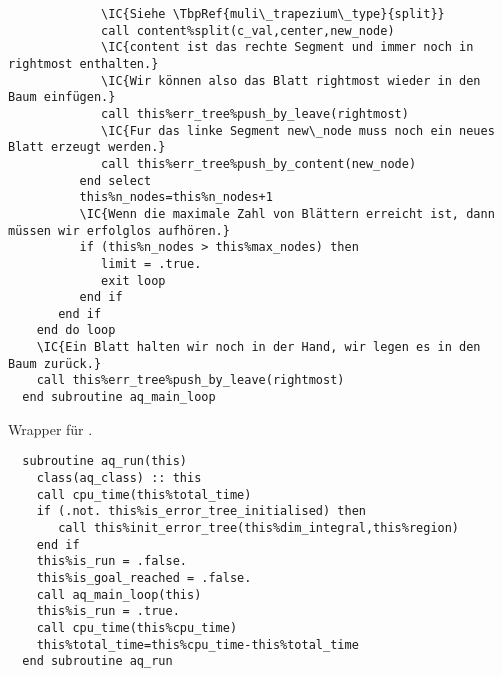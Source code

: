 \begin{Verbatim}
             \IC{Siehe \TbpRef{muli\_trapezium\_type}{split}}
             call content%split(c_val,center,new_node)
             \IC{content ist das rechte Segment und immer noch in rightmost enthalten.}
             \IC{Wir können also das Blatt rightmost wieder in den Baum einfügen.}
             call this%err_tree%push_by_leave(rightmost)
             \IC{Fur das linke Segment new\_node muss noch ein neues Blatt erzeugt werden.}
             call this%err_tree%push_by_content(new_node)
          end select
          this%n_nodes=this%n_nodes+1
          \IC{Wenn die maximale Zahl von Blättern erreicht ist, dann müssen wir erfolglos aufhören.}
          if (this%n_nodes > this%max_nodes) then
             limit = .true.             
             exit loop
          end if
       end if
    end do loop
    \IC{Ein Blatt halten wir noch in der Hand, wir legen es in den Baum zurück.}
    call this%err_tree%push_by_leave(rightmost)
  end subroutine aq_main_loop
\end{Verbatim}

Wrapper für .
\begin{Verbatim}
  subroutine aq_run(this)
    class(aq_class) :: this
    call cpu_time(this%total_time)
    if (.not. this%is_error_tree_initialised) then
       call this%init_error_tree(this%dim_integral,this%region)
    end if
    this%is_run = .false.
    this%is_goal_reached = .false.
    call aq_main_loop(this)
    this%is_run = .true.
    call cpu_time(this%cpu_time)
    this%total_time=this%cpu_time-this%total_time
  end subroutine aq_run
\end{Verbatim}


